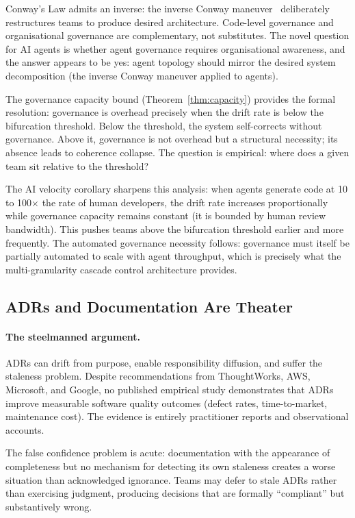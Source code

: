 Conway's Law admits an inverse: the inverse Conway
maneuver~\citep{skelton2019} deliberately restructures teams to produce desired
architecture.  Code-level governance and organisational governance are
complementary, not substitutes.  The novel question for AI agents is whether
agent governance requires organisational awareness, and the answer appears to be
yes: agent topology should mirror the desired system decomposition (the inverse
Conway maneuver applied to agents).

The governance capacity bound (Theorem~\ref{thm:capacity}) provides the formal
resolution: governance is overhead precisely when the drift rate is below the
bifurcation threshold.  Below the threshold, the system self-corrects without
governance.  Above it, governance is not overhead but a structural necessity;
its absence leads to coherence collapse.  The question is empirical: where does
a given team sit relative to the threshold?

The AI velocity corollary sharpens this analysis: when agents generate code at
10 to 100$\times$ the rate of human developers, the drift rate increases
proportionally while governance capacity remains constant (it is bounded by
human review bandwidth).  This pushes teams above the bifurcation threshold
earlier and more frequently.  The automated governance necessity follows:
governance must itself be partially automated to scale with agent throughput,
which is precisely what the multi-granularity cascade control architecture
provides.


\subsection{ADRs and Documentation Are Theater}
\label{sec:contrarian-adrs}

\paragraph{The steelmanned argument.}
ADRs can drift from purpose, enable responsibility diffusion, and suffer the staleness problem. Despite recommendations from ThoughtWorks, AWS, Microsoft, and Google, no published empirical study demonstrates that ADRs improve measurable software quality outcomes (defect rates, time-to-market, maintenance cost). The evidence is entirely practitioner reports and observational accounts.

The false confidence problem is acute: documentation with the appearance of completeness but no mechanism for detecting its own staleness creates a worse situation than acknowledged ignorance. Teams may defer to stale ADRs rather than exercising judgment, producing decisions that are formally ``compliant'' but substantively wrong.

